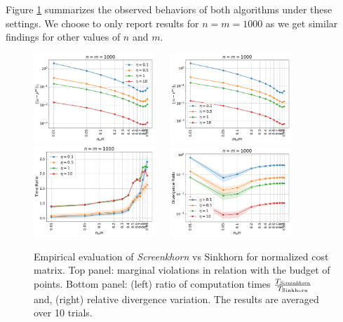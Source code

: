 Figure \ref{fig:margin_expe} summarizes the observed behaviors of both algorithms under these settings. We choose to only report results for $n=m=1000$ as we get similar findings for other values of $n$ and $m$. 

\begin{figure}[t]
	\begin{center}
		\includegraphics[width=4.55cm]{./figs/norm_M_Mu_marginals_toy_n1000} ~\hfill~
		\includegraphics[width=4.55cm]{./figs/norm_M_Nu_marginals_toy_n1000} ~\hfill \\
		\includegraphics[width=4.55cm]{./figs/norm_M_time_toy_n1000} ~\hfill~
		\includegraphics[width=4.55cm]{./figs/norm_M_div_toy_n1000}
	\end{center}
	\caption{Empirical evaluation of \emph{Screenkhorn} vs Sinkhorn for normalized cost matrix. Top panel: marginal violations in relation with the budget of points. Bottom panel: (left) ratio of computation times    $\frac{T_{\text{\emph{Screenkhorn}}}}{T_{\text{Sinkhorn}}}$ and, (right) relative divergence variation. The results are averaged over 10 trials.} 
		\label{fig:margin_expe}
\end{figure}
